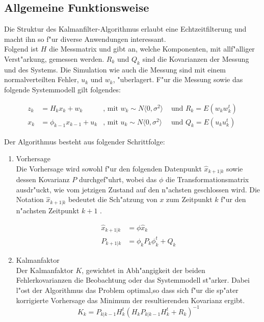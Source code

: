 \begin{refsection}
\subsection{Allgemeine Funktionsweise}

Die Struktur des Kalmanfilter-Algorithmus erlaubt eine Echtzeitfilterung und macht ihn so f"ur diverse Anwendungen interessant.\\

Folgend ist $H$ die Messmatrix und gibt an, welche Komponenten, mit allf"alliger Verst"arkung, gemessen werden. $R_{k}$ und $Q_{k}$ sind die Kovarianzen der Messung und des Systems. Die Simulation wie auch die Messung sind mit einem normalverteilten Fehler, \(u_{k} \text{ und } w_{k}\), "uberlagert. F"ur die Messung sowie das folgende Systemmodell gilt folgendes:\cite{skript:WRStat}

\begin{align*}
z_{k}&=H_{k}x_{k}+w_{k} &\text{, mit } w_{k}\sim N\langle0,\sigma^{2}\rangle &\text{ und }  R_{k}=E(w_{k}w^{t}_{k})\\
x_{k}&=\phi_{k-1}x_{k-1}+u_{k} &\text{, mit } u_{k}\sim N\langle0,\sigma^{2}\rangle &\text{ und } Q_{k}=E(u_{k}u^{t}_{k})
\end{align*}


Der Algorithmus besteht aus folgender Schrittfolge:
\begin{enumerate}

\item Vorhersage\\
Die Vorhersage wird sowohl f"ur den folgenden Datenpunkt $\hat{x}_{k+1|k}$ sowie dessen Kovarianz $P$ durchgef"uhrt, wobei das $\phi$ die Transformationsmatrix ausdr"uckt, wie vom jetzigen Zustand auf den n"achsten geschlossen wird. Die Notation $\hat{x}_{k+1|k}$ bedeutet die Sch"atzung von $x$ zum Zeitpunkt $k$ f"ur den n"achsten Zeitpunkt $k+1$ .

\begin{align*}
\hat{x}_{k+1|k} &= \phi\hat{x}_{k}\\
P_{k+1|k} &=\phi_{k}P_{k}\phi_{k}^{t}+Q_{k}
\end{align*}

\item Kalmanfaktor\\
Der Kalmanfaktor \(K\), gewichtet in Abh"angigkeit der beiden Fehlerkovarianzen die Beobachtung oder das Systemmodell st"arker. Dabei l"ost der Algorithmus das Problem optimal,so dass sich f"ur die sp"ater korrigierte Vorhersage das Minimum der resultierenden Kovarianz ergibt.\\
\[K_{k}=P_{k|k-1}H^{t}_{k}(H_{k}P_{k|k-1}H^{t}_{k}+R_{k})^{-1}   \]


\end{enumerate}
\end{refsection}
